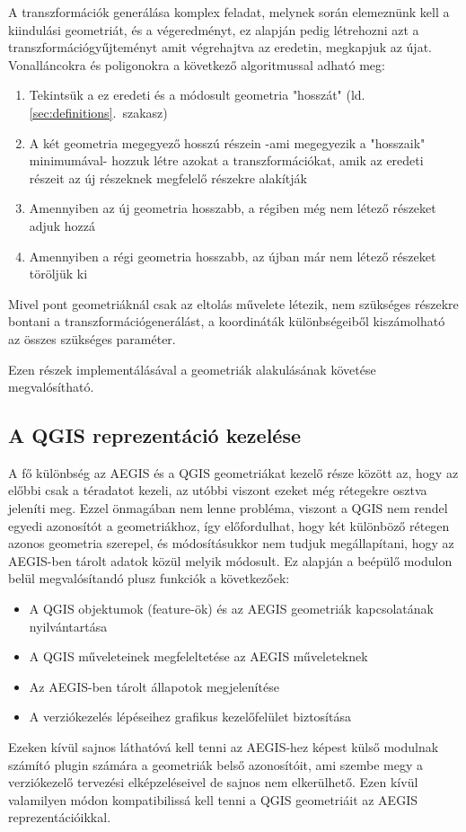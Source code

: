 A transzformációk generálása komplex feladat, melynek során elemeznünk kell a kiindulási geometriát, és a végeredményt, ez alapján pedig létrehozni azt a transzformációgyűjteményt amit végrehajtva az eredetin, megkapjuk az újat. Vonalláncokra és poligonokra a következő algoritmussal adható meg:
\begin{enumerate}
	\item Tekintsük a ez eredeti és a módosult geometria "hosszát" (ld. \ref{sec:definitions}.~szakasz)
	\item A két geometria megegyező hosszú részein -ami megegyezik a "hosszaik" minimumával- hozzuk létre azokat a transzformációkat, amik az eredeti részeit az új részeknek megfelelő részekre alakítják
	\item Amennyiben az új geometria hosszabb, a régiben még nem létező részeket adjuk hozzá
	\item Amennyiben a régi geometria hosszabb, az újban már nem létező részeket töröljük ki
\end{enumerate}

Mivel pont geometriáknál csak az eltolás művelete létezik, nem szükséges részekre bontani a transzformációgenerálást, a koordináták különbségeiből kiszámolható az összes szükséges paraméter.

Ezen részek implementálásával a geometriák alakulásának követése megvalósítható.

\subsection{A QGIS reprezentáció kezelése}
A fő különbség az AEGIS és a QGIS geometriákat kezelő része között az, hogy az előbbi csak a téradatot kezeli, az utóbbi viszont ezeket még rétegekre osztva jeleníti meg. Ezzel önmagában nem lenne probléma, viszont a QGIS nem rendel egyedi azonosítót a geometriákhoz, így előfordulhat, hogy két különböző rétegen azonos geometria szerepel, és módosításukkor nem tudjuk megállapítani, hogy az AEGIS-ben tárolt adatok közül melyik módosult. Ez alapján  a beépülő modulon belül megvalósítandó plusz funkciók a következőek:
\begin{itemize}
	\item A QGIS objektumok (feature-ök) és az AEGIS geometriák kapcsolatának nyilvántartása
	\item A QGIS műveleteinek megfeleltetése az AEGIS műveleteknek
	\item Az AEGIS-ben tárolt állapotok megjelenítése 
	\item A verziókezelés lépéseihez grafikus kezelőfelület biztosítása
\end{itemize}
Ezeken kívül sajnos láthatóvá kell tenni az AEGIS-hez képest külső modulnak számító plugin számára a geometriák belső azonosítóit, ami szembe megy a verziókezelő tervezési elképzeléseivel de sajnos nem elkerülhető. Ezen kívül valamilyen módon kompatibilissá kell tenni a QGIS geometriáit az AEGIS reprezentációikkal.

